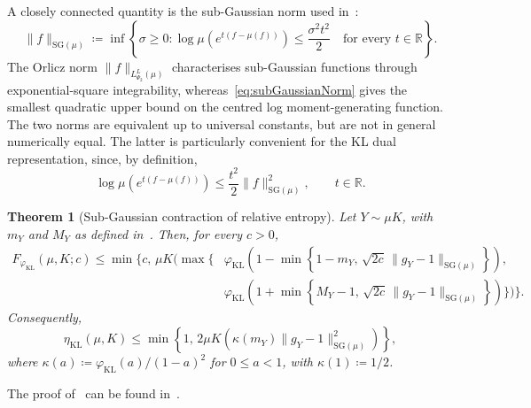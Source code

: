 \documentclass[11pt]{article}
\theoremstyle{plain}
\newtheorem{theorem}{Theorem}[section]
\theoremstyle{remark}
\begin{document}
A closely connected quantity is the sub-Gaussian norm used
in~\cite{sdpiRaginsky}:
\begin{equation}
\lVert f\rVert_{\mathrm{SG}(\mu)}
\coloneqq
\inf\left\{
\sigma\geq0:
\log\mu\left(
e^{t(f-\mu(f))}
\right)
\leq
\frac{\sigma^2t^2}{2}
\quad\text{for every }t\in\mathbb R
\right\}.
\label{eq:subGaussianNorm}
\end{equation}
The Orlicz norm
$\lVert f\rVert_{L_{\Psi_2}^{L}(\mu)}$ characterises
sub-Gaussian functions through exponential-square integrability,
whereas~\eqref{eq:subGaussianNorm} gives the smallest quadratic
upper bound on the centred log moment-generating function.
The two norms are equivalent up to universal constants, but are not
in general numerically equal.  The latter is particularly convenient
for the KL dual representation, since, by definition,
\begin{equation}
\log\mu\left(e^{t(f-\mu(f))}\right)
\leq
\frac{t^2}{2}
\lVert f\rVert_{\mathrm{SG}(\mu)}^2,
\qquad t\in\mathbb R.
\label{eq:subGaussianMGFBound}
\end{equation}
\begin{theorem}[Sub-Gaussian contraction of relative entropy]
\label{thm:subGaussianKLContraction}
Let $Y\sim\mu K$, with $m_Y$ and $M_Y$ as defined in~.
Then, for every $c>0$,
\begin{align}
F_{\varphi_{\mathrm{KL}}}(\mu,K;c)
\leq
\min\Bigg\{
c,\,
\mu K\Bigg(
\max\Bigg\{
&
\varphi_{\mathrm{KL}}\left(
1-
\min\left\{
1-m_Y,\,
\sqrt{2c}\,
\lVert g_Y-1\rVert_{\mathrm{SG}(\mu)}
\right\}
\right),
\nonumber\\
&
\varphi_{\mathrm{KL}}\left(
1+
\min\left\{
M_Y-1,\,
\sqrt{2c}\,
\lVert g_Y-1\rVert_{\mathrm{SG}(\mu)}
\right\}
\right)
\Bigg\}
\Bigg)
\Bigg\}.
\label{eq:subGaussianKLNonlinearContraction}
\end{align}
Consequently,
\begin{equation}
\eta_{\mathrm{KL}}(\mu,K)
\leq
\min\left\{
1,\,
2\mu K\left(
\kappa(m_Y)
\lVert g_Y-1\rVert_{\mathrm{SG}(\mu)}^2
\right)
\right\},
\label{eq:subGaussianKLSDPI}
\end{equation}
where \(\kappa(a)\coloneqq \varphi_{\mathrm{KL}}(a)/(1-a)^2\) for \(0\leq a<1\), with \(\kappa(1)\coloneqq 1/2\).
\end{theorem}

The proof of~ can be found in~.
\end{document}
